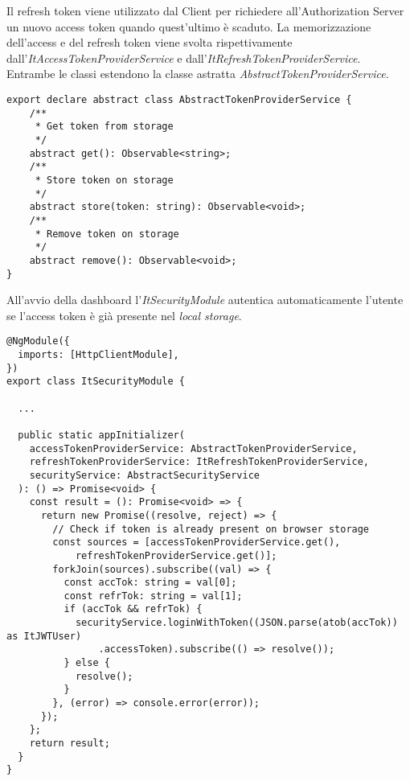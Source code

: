 \FloatBarrier 
Il refresh token viene utilizzato dal Client per richiedere all'Authorization Server un nuovo access token quando quest'ultimo è scaduto.
La memorizzazione dell'access e del refresh token viene svolta rispettivamente dall'\textit{ItAccessTokenProviderService} e dall'\textit{ItRefreshTokenProviderService}.
Entrambe le classi estendono la classe astratta \textit{AbstractTokenProviderService}.\\
\begin{lstlisting}[caption={Classe astratta AbstractTokenProviderService}, style=javaScriptCode]
export declare abstract class AbstractTokenProviderService {
    /**
     * Get token from storage
     */
    abstract get(): Observable<string>;
    /**
     * Store token on storage
     */
    abstract store(token: string): Observable<void>;
    /**
     * Remove token on storage
     */
    abstract remove(): Observable<void>;
}
\end{lstlisting}
All'avvio della dashboard l'\textit{ItSecurityModule} autentica automaticamente l'utente se l'access token è già presente nel \textit{local storage}.\newline
\begin{lstlisting}[caption={Login con token nell'ItSecurityModule}, style=javaScriptCode]
@NgModule({
  imports: [HttpClientModule],
})
export class ItSecurityModule {
    
  ...

  public static appInitializer(
    accessTokenProviderService: AbstractTokenProviderService,
    refreshTokenProviderService: ItRefreshTokenProviderService,
    securityService: AbstractSecurityService
  ): () => Promise<void> {
    const result = (): Promise<void> => {
      return new Promise((resolve, reject) => {
        // Check if token is already present on browser storage
        const sources = [accessTokenProviderService.get(), 
            refreshTokenProviderService.get()];
        forkJoin(sources).subscribe((val) => {
          const accTok: string = val[0];
          const refrTok: string = val[1];
          if (accTok && refrTok) {
            securityService.loginWithToken((JSON.parse(atob(accTok)) as ItJWTUser)
                .accessToken).subscribe(() => resolve());
          } else {
            resolve();
          }
        }, (error) => console.error(error));
      });
    };
    return result;
  }
}
\end{lstlisting}
\pagebreak
